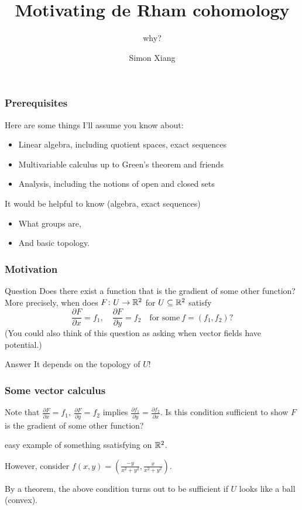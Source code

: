 \documentclass[xcolor=dvipsnames]{beamer}
\title{Motivating de Rham cohomology}
\subtitle{why?}
\author{Simon Xiang}
\institute{University of Texas at Austin}
\begin{document}
 
    \begin{frame}
        \titlepage
    \end{frame}

    \begin{frame}
        \frametitle{Prerequisites} 
        Here are some things I'll assume you know about:\pause
        \begin{itemize}
            \item Linear algebra, including quotient spaces, exact sequences\pause
            \item Multivariable calculus up to Green's theorem and friends\pause
            \item Analysis, including the notions of open and closed sets\pause
        \end{itemize}
        It would be helpful to know (algebra, exact sequences)
        \begin{itemize}
            \item What groups are,\pause
            \item And basic topology.
        \end{itemize}
    \end{frame}

    \begin{frame}
        \frametitle{Motivation} 
        \begin{exampleblock}{Question} 
            Does there exist a function that is the gradient of some other function? More precisely, when does $F \colon U \to \mathbb{R}^2$ for $U \subseteq \mathbb{R}^2$ satisfy \[
                \frac{\partial F}{\partial x}=f_1,\quad \frac{\partial F}{\partial y}=f_2 \quad \text{for some} \ f=(f_1,f_2)?
            \] (You could also think of this question as asking when vector fields have potential.)
        \end{exampleblock}\pause
        \begin{exampleblock}{Answer} 
           It depends on the topology of $U$! 
        \end{exampleblock}
    \end{frame}
    
    \begin{frame}
    \frametitle{Some vector calculus} 
    Note that $\frac{\partial F}{\partial x}=f_1,\ \frac{\partial F}{\partial y}=f_2$ implies $\frac{\partial f_1}{\partial y}=\frac{\partial f_2}{\partial x}$. Is this condition sufficient to show $F$ is the gradient of some other function?
    \begin{example}
        easy example of something ssatisfying on $\mathbb{R}^2$.
    \end{example}\pause
    \begin{example}
        However, consider $f(x,y)=\left( \frac{-y}{x^2+y^2},\frac{x}{x^2+y^2} \right) $.
    \end{example}\pause
    By a theorem, the above condition turns out to be sufficient if $U$ looks like a ball (convex).
    \end{frame}
\end{document}
